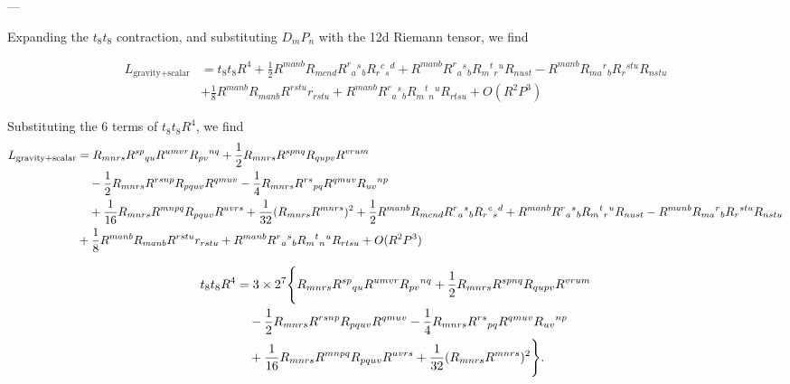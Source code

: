 

---

Expanding the $t_8t_8$ contraction, and substituting $D_m P_n$ with the 12d Riemann tensor, we find

\begin{equation}
\begin{aligned}
L_{\text{gravity+scalar}} 
&= 
t_8t_8 R^4
+ \frac12 R^{manb} R_{mcnd} R^r{}_a{}^s{}_b R_r{}^c{}_s{}^d
+ R^{manb} R^r{}_a{}^s{}_b R_m{}^t{}_r{}^u R_{nust}
- R^{manb} R_{ma}{}^r{}_b R_r{}^{stu} R_{nstu}\\
&+\frac18 R^{manb} R_{manb} R^{rstu} r_{rstu}
+ R^{manb} R^r{}_a{}^s{}_b R_m{}^t{}_n{}^u R_{rtsu}
+ O(R^2 P^3)
\end{aligned}
\label{eq:4pt-gravity-axiodilaton-expanded}
\end{equation}

Substituting the 6 terms of $t_8t_8 R^4$, we find
\begin{equation}
\begin{aligned}
L_{\text{gravity+scalar}} 
&= 
R_{mnrs} R^{sp}{}_{qu} R^{umvr} R_{pv}{}^{nq}
+ \frac{1}{2} R_{mnrs} R^{spnq} R_{qupv} R^{vrum} \notag \\
&\quad - \frac{1}{2} R_{mnrs} R^{rsnp} R_{pquv} R^{qmuv}
- \frac{1}{4} R_{mnrs} R^{rs}{}_{pq} R^{qmuv} R_{uv}{}^{np} \notag \\
&\quad + \frac{1}{16} R_{mnrs} R^{mnpq} R_{pquv} R^{uvrs}
+ \frac{1}{32} (R_{mnrs} R^{mnrs})^2
+ \frac12 R^{manb} R_{mcnd} R^r{}_a{}^s{}_b R_r{}^c{}_s{}^d
+ R^{manb} R^r{}_a{}^s{}_b R_m{}^t{}_r{}^u R_{nust}
- R^{manb} R_{ma}{}^r{}_b R_r{}^{stu} R_{nstu}\\
&+\frac18 R^{manb} R_{manb} R^{rstu} r_{rstu}
+ R^{manb} R^r{}_a{}^s{}_b R_m{}^t{}_n{}^u R_{rtsu}
+ O(R^2 P^3)
\end{aligned}
\label{eq:4pt-gravity-axiodilaton-expanded}
\end{equation}



\begin{equation}
\begin{aligned}
t_8 t_8 R^4 &= 3 \times 2^7 \Biggl\{
R_{mnrs} R^{sp}{}_{qu} R^{umvr} R_{pv}{}^{nq}
+ \frac{1}{2} R_{mnrs} R^{spnq} R_{qupv} R^{vrum} \notag \\
&\quad - \frac{1}{2} R_{mnrs} R^{rsnp} R_{pquv} R^{qmuv}
- \frac{1}{4} R_{mnrs} R^{rs}{}_{pq} R^{qmuv} R_{uv}{}^{np} \notag \\
&\quad + \frac{1}{16} R_{mnrs} R^{mnpq} R_{pquv} R^{uvrs}
+ \frac{1}{32} (R_{mnrs} R^{mnrs})^2
\Biggr\}. \label{eq:A2}
\end{aligned}
\end{equation}

